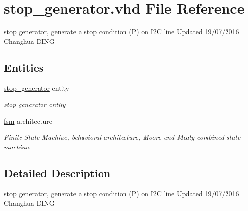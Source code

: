 \hypertarget{stop__generator_8vhd}{}\section{stop\+\_\+generator.\+vhd File Reference}
\label{stop__generator_8vhd}


stop generator, generate a stop condition (P) on I2C line Updated 19/07/2016 Changhua D\+I\+NG  


\subsection*{Entities}
\begin{DoxyCompactItemize}
\item 
\hyperlink{classstop__generator}{stop\+\_\+generator} entity
\begin{DoxyCompactList}\small\item\em stop generator entity \end{DoxyCompactList}\item 
\hyperlink{classstop__generator_1_1fsm}{fsm} architecture
\begin{DoxyCompactList}\small\item\em Finite State Machine, behavioral architecture, Moore and Mealy combined state machine. \end{DoxyCompactList}\end{DoxyCompactItemize}


\subsection{Detailed Description}
stop generator, generate a stop condition (P) on I2C line Updated 19/07/2016 Changhua D\+I\+NG 

